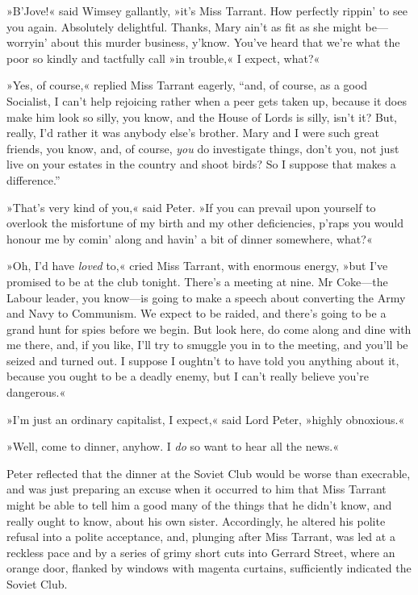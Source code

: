 »B'Jove!« said Wimsey gallantly, »it's Miss Tarrant. How perfectly rippin' to see you again. Absolutely delightful. Thanks, Mary ain't as fit as she might be—worryin' about this murder business, y'know.  You've heard that we're what the poor so kindly and tactfully call »in trouble,« I expect, what?«

»Yes, of course,« replied Miss Tarrant eagerly, \enquote{and, of course, as a good Socialist, I can't help rejoicing rather when a peer gets taken up, because it does make him look so silly, you know, and the House of Lords is silly, isn't it? But, really, I'd rather it was anybody else's brother. Mary and I were such great friends, you know, and, of course, \textit{you} do investigate things, don't you, not just live on your estates in the country and shoot birds? So I suppose that makes a difference.}

»That's very kind of you,« said Peter. »If you can prevail upon yourself to overlook the misfortune of my birth and my other deficiencies, p'raps you would honour me by comin' along and havin' a bit of dinner somewhere, what?«

»Oh, I'd have \textit{loved} to,« cried Miss Tarrant, with enormous energy, »but I've promised to be at the club tonight. There's a meeting at nine. Mr Coke—the Labour leader, you know—is going to make a speech about converting the Army and Navy to Communism. We expect to be raided, and there's going to be a grand hunt for spies before we begin.  But look here, do come along and dine with me there, and, if you like, I'll try to smuggle you in to the meeting, and you'll be seized and turned out. I suppose I oughtn't to have told you anything about it, because you ought to be a deadly enemy, but I can't really believe you're dangerous.«

»I'm just an ordinary capitalist, I expect,« said Lord Peter, »highly obnoxious.«

»Well, come to dinner, anyhow. I \textit{do} so want to hear all the news.«

Peter reflected that the dinner at the Soviet Club would be worse than execrable, and was just preparing an excuse when it occurred to him that Miss Tarrant might be able to tell him a good many of the things that he didn't know, and really ought to know, about his own sister.  Accordingly, he altered his polite refusal into a polite acceptance, and, plunging after Miss Tarrant, was led at a reckless pace and by a series of grimy short cuts into Gerrard Street, where an orange door, flanked by windows with magenta curtains, sufficiently indicated the Soviet Club.

